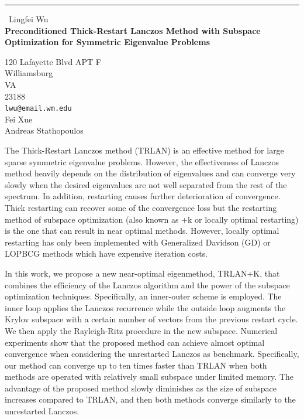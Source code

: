 \documentclass{report}
\begin{document}
\begin{center}
\rule{6in}{1pt} \
{\large Lingfei Wu \\
{\bf Preconditioned Thick-Restart Lanczos Method with Subspace Optimization for Symmetric Eigenvalue Problems}}

120 Lafayette Blvd APT F \\ Williamsburg \\ VA \\ 23188
\\
{\tt lwu@email.wm.edu}\\
Fei  Xue\\
Andreas Stathopoulos\end{center}

The Thick-Restart Lanczos method (TRLAN) is an effective method for large
sparse symmetric eigenvalue problems. However, the effectiveness of
Lanczos method heavily depends on the distribution of eigenvalues and can
converge very slowly when the desired eigenvalues are not well separated
from the rest of the spectrum. In addition, restarting causes further
deterioration of convergence. Thick restarting can recover some of the
convergence loss but the restarting method of subspace optimization (also
known as +k or locally optimal restarting) is the one that can result in
near optimal methods. However, locally optimal restarting has only been
implemented with Generalized Davidson (GD) or LOPBCG methods which have
expensive iteration costs.

In this work, we propose a new near-optimal eigenmethod, TRLAN+K, that
combines the efficiency of the Lanczos algorithm and the power of the
subspace optimization techniques. Specifically, an inner-outer scheme is
employed. The inner loop applies the Lanczos recurrence while the outside
loop augments the Krylov subspace with a certain number of vectors from
the previous restart cycle. We then apply the Rayleigh-Ritz procedure in
the new subspace. Numerical experiments show that the proposed method can
achieve almost optimal convergence when considering the unrestarted
Lanczos as benchmark. Specifically, our method can converge up to ten
times faster than TRLAN when both methods are operated with relatively
small subspace under limited memory. The advantage of the proposed method
slowly diminishes as the size of subspace increases compared to TRLAN,
and then both methods converge similarly to the unrestarted Lanczos.
\end{document}
